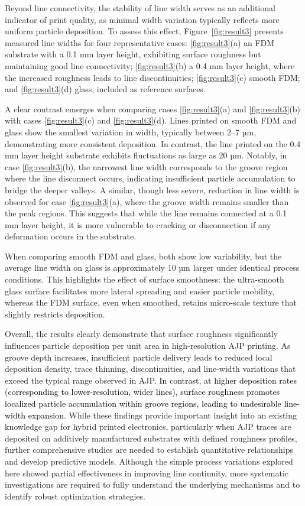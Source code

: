 \documentclass[subscriptcorrection,upint,varvw,balance,hyphenate]{asmejour}
\newcommand{\rev}[1]{\textcolor{black}{#1\xspace}}
\begin{document}
Beyond line connectivity, the stability of line width serves as an additional indicator of print quality, as minimal width variation typically reflects more uniform particle deposition. To assess this effect, Figure~\ref{fig:result3} presents measured line widths for four representative cases:
\ref{fig:result3}(a) an FDM substrate with a 0.1 mm layer height, exhibiting surface roughness but maintaining good line connectivity;
\ref{fig:result3}(b) a 0.4 mm layer height, where the increased roughness leads to line discontinuities;
\ref{fig:result3}(c) smooth FDM; and
\ref{fig:result3}(d) glass, included as reference surfaces.

A clear contrast emerges when comparing cases \ref{fig:result3}(a) and \ref{fig:result3}(b)  with cases \ref{fig:result3}(c) and \ref{fig:result3}(d). Lines printed on smooth FDM and glass show the smallest variation in width, typically between 2–7 µm, demonstrating more consistent deposition. In contrast, the line printed on the 0.4 mm layer height substrate exhibits fluctuations as large as 20 µm. Notably, in case \ref{fig:result3}(b), the narrowest line width corresponds to the groove region where the line disconnect occurs, indicating insufficient particle accumulation to bridge the deeper valleys. A similar, though less severe, reduction in line width is observed for case \ref{fig:result3}(a), where the groove width remains smaller than the peak regions. This suggests that while the line remains connected at a 0.1 mm layer height, it is more vulnerable to cracking or disconnection if any deformation occurs in the substrate.

When comparing smooth FDM and glass, both show low variability, but the average line width on glass is approximately 10 µm larger under identical process conditions. This highlights the effect of surface smoothness: the ultra-smooth glass surface facilitates more lateral spreading and easier particle mobility, whereas the FDM surface, even when smoothed, retains micro-scale texture that slightly restricts deposition.

Overall, the results clearly demonstrate that surface roughness significantly influences particle deposition per unit area in high-resolution AJP printing. As groove depth increases, insufficient particle delivery leads to reduced local deposition density, trace thinning, discontinuities, and line-width variations that exceed the typical range observed in AJP. \rev{In contrast, at higher deposition rates (corresponding to lower-resolution, wider lines), surface roughness promotes localized particle accumulation within groove regions, leading to undesirable line-width expansion.} While these findings provide important insight into an existing knowledge gap for hybrid printed electronics, particularly when AJP traces are deposited on additively manufactured substrates with defined roughness profiles, further comprehensive studies are needed to establish quantitative relationships and develop predictive models. Although the simple process variations explored here showed partial effectiveness in improving line continuity, more systematic investigations are required to fully understand the underlying mechanisms and to identify robust optimization strategies.
\end{document}
